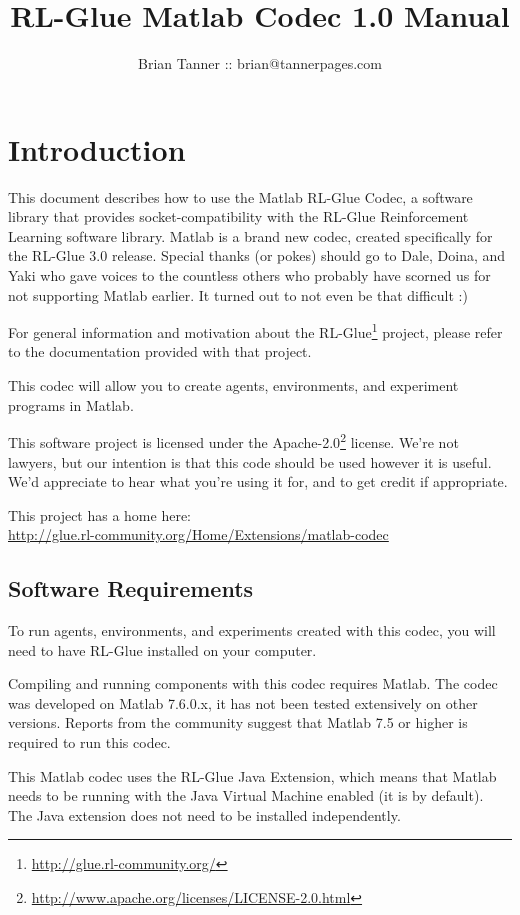 \documentclass[11pt]{article}
\title{RL-Glue Matlab Codec 1.0 Manual }
\author{Brian Tanner :: brian@tannerpages.com}
\date{}
\begin{document}
\maketitle
\tableofcontents

\section{Introduction}

This document describes how to use the Matlab RL-Glue Codec, a software library that provides socket-compatibility with the RL-Glue Reinforcement Learning software library.  Matlab is a brand new codec, created specifically for the RL-Glue 3.0 release.  Special thanks (or pokes) should go to Dale, Doina, and Yaki who gave voices to the countless others who probably
have scorned us for not supporting Matlab earlier.  It turned out to not even be that difficult :)

For general information and motivation about the RL-Glue\footnote{\url{http://glue.rl-community.org/}} project, please refer to the documentation provided with that project.

This codec will allow you to create agents, environments, and experiment programs in Matlab.

This software project is licensed under the Apache-2.0\footnote{\url{http://www.apache.org/licenses/LICENSE-2.0.html}} license. We're not lawyers, but our intention is that this code 
should be used however it is useful.  We'd appreciate to hear what you're using it for, and to get credit if appropriate.

This project has a home here:\\
\url{http://glue.rl-community.org/Home/Extensions/matlab-codec}


\subsection{Software Requirements}
To run agents, environments, and experiments created with this codec, you will need to have RL-Glue installed on your computer.

Compiling and running components with this codec requires Matlab.  The codec was developed on Matlab 7.6.0.x, it has not been tested extensively on other versions.  Reports from the community suggest that Matlab 7.5 or higher is required to run this codec.

This Matlab codec uses the RL-Glue Java Extension, which means that Matlab needs to be running with the Java Virtual Machine enabled (it is by default).  The Java extension does not need to be installed independently.
\end{document}
